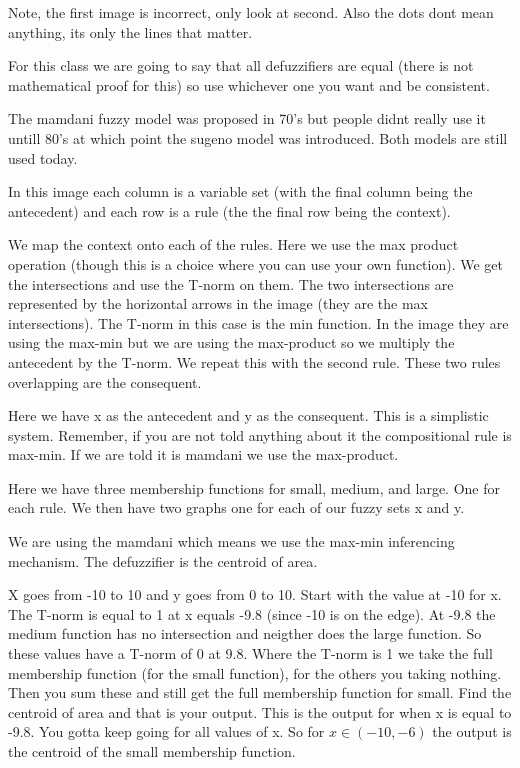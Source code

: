 \documentclass{article}
\begin{document}

Note, the first image is incorrect, only look at second. Also the dots dont mean anything, its only the lines that matter.

For this class we are going to say that all defuzzifiers are equal (there is not mathematical proof for this) so use whichever one you want and be consistent.


The mamdani fuzzy model was proposed in 70's but people didnt really use it untill 80's at which point the sugeno model was introduced. Both models are still used today.


In this image each column is a variable set (with the final column being the antecedent) and each row is a rule (the the final row being the context).

We map the context onto each of the rules. Here we use the max product operation (though this is a choice where you can use your own function). We get the intersections and use the T-norm on them. The two intersections are represented by the horizontal arrows in the image (they are the max intersections). The T-norm in this case is the min function. In the image they are using the max-min but we are using the max-product so we multiply the antecedent by the T-norm. We repeat this with the second rule. These two rules overlapping are the consequent.


Here we have x as the antecedent and y as the consequent. This is a simplistic system. Remember, if you are not told anything about it the compositional rule is max-min. If we are told it is mamdani we use the max-product.



Here we have three membership functions for small, medium, and large. One for each rule. We then have two graphs one for each of our fuzzy sets x and y.

We are using the mamdani which means we use the max-min inferencing mechanism. The defuzzifier is the centroid of area.

X goes from -10 to 10 and y goes from 0 to 10. Start with the value at -10 for x. The T-norm is equal to 1 at x equals -9.8 (since -10 is on the edge). At -9.8 the medium function has no intersection and neigther does the large function. So these values have a T-norm of 0 at 9.8. Where the T-norm is 1 we take the full membership function (for the small function), for the others you taking nothing. Then you sum these and still get the full membership function for small. Find the centroid of area and that is your output. This is the output for when x is equal to -9.8. You gotta keep going for all values of x. So for $x\in(-10,-6)$ the output is the centroid of the small membership function.
\end{document}

